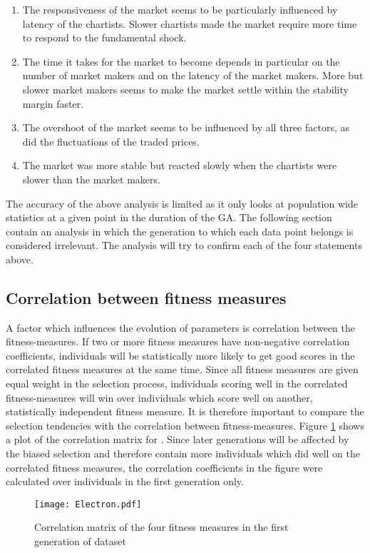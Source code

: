 \begin{enumerate}
\item The responsiveness of the market seems to be particularly influenced by latency of the chartists. Slower chartists made the market require more time to respond to the fundamental shock.
\item The time it takes for the market to become depends in particular on the number of market makers and on the latency of the market makers. More but slower market makers seems to make the market settle within the stability margin faster.
\item The overshoot of the market seems to be influenced by all three factors, as did the fluctuations of the traded prices.
\item The market was more stable but reacted slowly when the chartists were slower than the market makers.
\end{enumerate}
The accuracy of the above analysis is limited as it only looks at population wide statistics at a given point in the duration of the GA. The following section contain an analysis in which the generation to which each data point belongs is considered irrelevant. The analysis will try to confirm each of the four statements above.




\subsection{Correlation between fitness measures}\label{section:correlation_fitness}
A factor which influences the evolution of parameters is correlation between the fitness-measures. If two or more fitness measures have non-negative correlation coefficients, individuals will be statistically more likely to get good scores in the correlated fitness measures at the same time. Since all fitness measures are given equal weight in the selection process, individuals scoring well in the correlated fitness-measures will win over individuals which score well on another, statistically independent fitness measure. It is therefore important to compare the selection tendencies with the correlation between fitness-measures. Figure \ref{figure:d10_fitness_correlation} shows a plot of the correlation matrix for \dten. Since later generations will be affected by the biased selection and therefore contain more individuals which did well on the correlated fitness measures, the correlation coefficients in the figure were calculated over individuals in the first generation only.
\begin{figure}
\centering
\texttt{[image: Electron.pdf]}
\caption{Correlation matrix of the four fitness measures in the first generation of dataset \dten	}
\label{figure:d10_fitness_correlation}
\end{figure}

